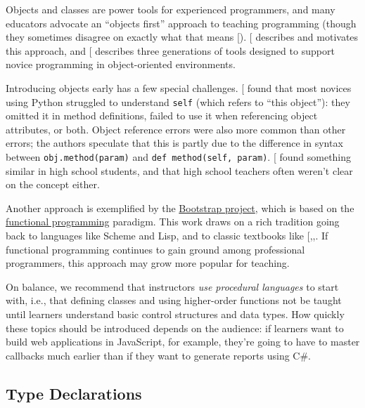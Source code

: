 Objects and classes are power tools for experienced programmers, and
many educators advocate an ``objects first'' approach to teaching
programming (though they sometimes disagree on exactly what that means
{[}\protect[\hyperlink{b:Benn2007b}{Benn2007b}]{]}). {[}\protect[\hyperlink{b:Sorv2014}{Sorv2014}]{]} describes and motivates this
approach, and {[}\protect[\hyperlink{b:Koll2015}{Koll2015}]{]} describes three generations of tools
designed to support novice programming in object-oriented environments.

Introducing objects early has a few special challenges.
{[}\protect[\hyperlink{b:Mill2016b}{Mill2016b}]{]} found that most novices using Python struggled to
understand \texttt{self} (which refers to ``this object''): they omitted it in
method definitions, failed to use it when referencing object attributes,
or both. Object reference errors were also more common than other
errors; the authors speculate that this is partly due to the difference
in syntax between \texttt{obj.method(param)} and \texttt{def\ method(self,\ param)}.
{[}\protect[\hyperlink{b:Rago2017}{Rago2017}]{]} found something similar in high school students, and
that high school teachers often weren't clear on the concept either.

Another approach is exemplified by the \href{http://www.bootstrapworld.org/}{Bootstrap project},
which is based on the \protect\hyperlink{g:functional-programming}{functional
programming} paradigm. This work draws on a
rich tradition going back to languages like Scheme and Lisp, and to
classic textbooks like
{[},,\protect[\hyperlink{b:Abel1996}{Abel1996}]{]}. If functional
programming continues to gain ground among professional programmers,
this approach may grow more popular for teaching.

On balance, we recommend that instructors \emph{use procedural languages} to
start with, i.e., that defining classes and using higher-order functions
not be taught until learners understand basic control structures and
data types. How quickly these topics should be introduced depends on the
audience: if learners want to build web applications in JavaScript, for
example, they're going to have to master callbacks much earlier than if
they want to generate reports using C\#.

\subsection{Type Declarations}\label{type-declarations}

